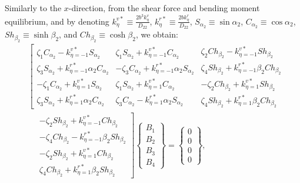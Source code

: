 \documentclass[preprint,12pt,number]{elsarticle}
\begin{document}
Similarly to the $x$-direction, from the shear force and bending moment equilibrium, and by denoting 
$k^{v*}_{\eta} \equiv \frac{2b^3 k^v_{\eta}}{D_{22}} $, 
$ k^{r*}_{\eta} \equiv \frac{2b k^r_{\eta}}{D_{22}} $, 
$S_{\alpha_2}\equiv\sin\alpha_2  $, 
$ C_{\alpha_2}\equiv\cos\alpha_2  $, 
$ Sh_{\beta_2}\equiv\sinh\beta_2$, and 
$Ch_{\beta_2}\equiv \cosh\beta_2$, 
we obtain:
%
\begin{equation}\label{eq:ABy}
\begin{split}
	&\left[ \begin{array}{c}
		\zeta_1C_{\alpha_2}-k^{v*}_{\eta=-1}S_{\alpha_2} \\ \zeta_3S_{\alpha_2}+k^{r*}_{\eta=-1}\alpha_2C_{\alpha_2} \\ -\zeta_1C_{\alpha_2}+k^{v*}_{\eta=1}S_{\alpha_2} \\ \zeta_3S_{\alpha_2}+k^{r*}_{\eta=1}\alpha_2C_{\alpha_2}
	\end{array} \begin{array}{c}
		\zeta_1S_{\alpha_2}+k^{v*}_{\eta=-1}C_{\alpha_2} \\ -\zeta_3C_{\alpha_2}+k^{r*}_{\eta=-1}\alpha_2S_{\alpha_2} \\ \zeta_1S_{\alpha_2}+k^{v*}_{\eta=1}C_{\alpha_2} \\ \zeta_3C_{\alpha_2}-k^{r*}_{\eta=1}\alpha_2S_{\alpha_2}
	\end{array} \begin{array}{c}
		\zeta_2Ch_{\beta_2}-k^{v*}_{\eta=-1}Sh_{\beta_2} \\ \zeta_4Sh_{\beta_2}+k^{r*}_{\eta=-1}\beta_2Ch_{\beta_2} \\ -\zeta_2Ch_{\beta_2}+k^{v*}_{\eta=1}Sh_{\beta_2} \\ \zeta_4Sh_{\beta_2}+k^{r*}_{\eta=1}\beta_2Ch_{\beta_2}
	\end{array} \right. \\
	&\quad
	\left. \begin{array}{c}
		-\zeta_2Sh_{\beta_2}+k^{v*}_{\eta=-1}Ch_{\beta_2} \\ -\zeta_4Ch_{\beta_2}-k^{r*}_{\eta=-1}\beta_2Sh_{\beta_2} \\ -\zeta_2Sh_{\beta_2}+k^{v*}_{\eta=1}Ch_{\beta_2} \\ \zeta_4Ch_{\beta_2}+k^{r*}_{\eta=1}\beta_2Sh_{\beta_2}
	\end{array} \right]\begin{Bmatrix}
		B_1\\B_2\\B_3\\B_4
	\end{Bmatrix}=\begin{Bmatrix}
		0\\0\\0\\0
	\end{Bmatrix},
\end{split}
\end{equation}
\end{document}
